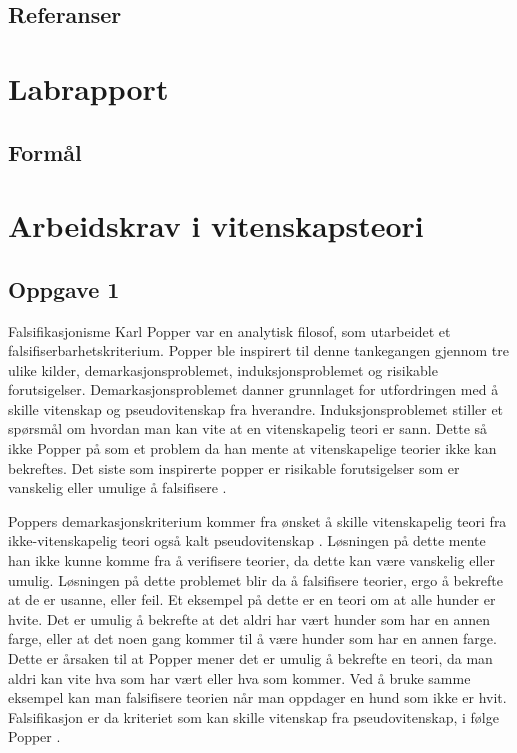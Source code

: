 \documentclass[
]{book}
\begin{document}
\hypertarget{referanser}{%
\section{Referanser}\label{referanser}}

\hypertarget{labrapport}{%
\chapter{Labrapport}\label{labrapport}}

\hypertarget{formuxe5l}{%
\section{Formål}\label{formuxe5l}}

\hypertarget{arbeidskrav-i-vitenskapsteori}{%
\chapter{Arbeidskrav i vitenskapsteori}\label{arbeidskrav-i-vitenskapsteori}}

\hypertarget{oppgave-1}{%
\section{Oppgave 1}\label{oppgave-1}}

Falsifikasjonisme Karl Popper var en analytisk filosof, som utarbeidet et falsifiserbarhetskriterium. Popper ble inspirert til denne tankegangen gjennom tre ulike kilder, demarkasjonsproblemet, induksjonsproblemet og risikable forutsigelser. Demarkasjonsproblemet danner grunnlaget for utfordringen med å skille vitenskap og pseudovitenskap fra hverandre. Induksjonsproblemet stiller et spørsmål om hvordan man kan vite at en vitenskapelig teori er sann. Dette så ikke Popper på som et problem da han mente at vitenskapelige teorier ikke kan bekreftes. Det siste som inspirerte popper er risikable forutsigelser som er vanskelig eller umulige å falsifisere \citep{alnes2018}.

Poppers demarkasjonskriterium kommer fra ønsket å skille vitenskapelig teori fra ikke-vitenskapelig teori også kalt pseudovitenskap \citep{dellsén2021}. Løsningen på dette mente han ikke kunne komme fra å verifisere teorier, da dette kan være vanskelig eller umulig. Løsningen på dette problemet blir da å falsifisere teorier, ergo å bekrefte at de er usanne, eller feil. Et eksempel på dette er en teori om at alle hunder er hvite. Det er umulig å bekrefte at det aldri har vært hunder som har en annen farge, eller at det noen gang kommer til å være hunder som har en annen farge. Dette er årsaken til at Popper mener det er umulig å bekrefte en teori, da man aldri kan vite hva som har vært eller hva som kommer. Ved å bruke samme eksempel kan man falsifisere teorien når man oppdager en hund som ikke er hvit. Falsifikasjon er da kriteriet som kan skille vitenskap fra pseudovitenskap, i følge Popper \citep{okasha2016}.
\end{document}
